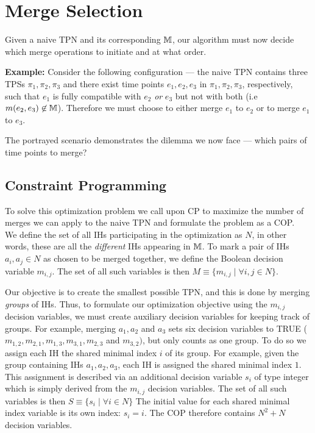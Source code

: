 \section{Merge Selection}
\label{generating: merge selection}
Given a naive TPN and its corresponding $\mathbb{M}$, our algorithm must now decide which 
merge operations to initiate and at what order. 

\begin{tcolorbox}[colback=blue!5!white,colframe=blue!75!black]
     \textbf{Example:} Consider the following configuration --- the naive TPN contains three
     TPSs $\pi_1,\pi_2,\pi_3$ and there exist time points 
     $e_1, e_2, e_3$ in $\pi_1, \pi_2, \pi_3$, respectively, such that $e_1$ is fully
     compatible with $e_2$ \textit{or} $e_3$ but not with both (i.e $m(e_2,e_3) \not \in \mathbb{M}$).
     Therefore we must choose to either merge $e_1$ to $e_2$ or to merge $e_1$ to $e_3$.
  \end{tcolorbox}


The portrayed scenario demonstrates the dilemma we now face --- 
which pairs of time points to merge? 


\subsection{Constraint Programming} To solve this optimization problem we call upon
CP to maximize the number of merges we can apply to the naive TPN and formulate the 
problem as a COP. \\ 

We define the set of all IHs participating in the optimization as $N$, in other words,
these are all the {\em different} IHs appearing in $\mathbb{M}$.
To mark a pair of IHs $a_i,a_j \in N$ as chosen to be merged together, 
we define the Boolean decision variable $m_{i,j}$. The set of all such variables is then
 $M \equiv \{m_{i,j} \mid \forall i,j \in N\}$.

Our objective is to create the smallest possible TPN, and this is done by merging {\em groups} of IHs. Thus, to formulate our optimization objective using the $m_{i,j}$ decision variables, we must create auxiliary decision variables for keeping track of groups. For example, merging $a_1, a_2$ and $a_3$ sets six decision variables to TRUE ($m_{1,2}, m_{2,1}, m_{1,3}, m_{3,1}, m_{2,3}$ and $m_{3,2})$, but only counts as one group.
To do so we assign each IH the shared minimal index $i$ of its group.
For example, given the group containing IHs $a_1,a_2,a_3$, each IH is assigned the shared minimal index $1$.
This assignment is described via an additional decision variable $s_i$ of type integer which is simply derived from the $m_{i,j}$ decision variables. The set of all such variables is then $S \equiv \{s_i \mid \forall i \in N\}$
The initial value for each shared minimal index variable is its own index: $s_i = i$.
The COP therefore contains $N^2 + N$ decision variables.

